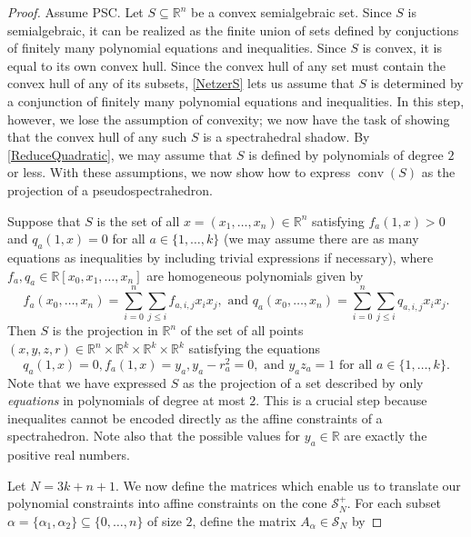 \documentclass[11pt]{article} %
\newcommand{\R}{\mathbb{R}}
\newcommand{\s}{\mathcal{S}}
\DeclareMathOperator{\conv}{conv}
\begin{document}
\begin{proof}
Assume PSC. Let $S \subseteq \R^n$ be a convex semialgebraic set. Since $S$ is semialgebraic, it can be realized as the finite union of sets defined by conjuctions of finitely many polynomial equations and inequalities. Since $S$ is convex, it is equal to its own convex hull. Since the convex hull of any set must contain the convex hull of any of its subsets, \ref{NetzerS} lets us assume that $S$ is determined by a conjunction of finitely many polynomial equations and inequalities. In this step, however, we lose the assumption of convexity; we now have the task of showing that the convex hull of any such $S$ is a spectrahedral shadow. By \ref{ReduceQuadratic}, we may assume that $S$ is defined by polynomials of degree $2$ or less. With these assumptions, we now show how to express $\conv( S)$ as the projection of a pseudospectrahedron.

Suppose that $S$ is the set of all $x=(x_1,\ldots,x_n) \in \R^n$ satisfying $f_a(1,x) > 0$ and $q_a(1,x) = 0$ for all $a \in \{ 1,\ldots,k\}$ (we may assume there are as many equations as inequalities by including trivial expressions if necessary), where $f_a,q_a \in \R[x_0,x_1,\ldots,x_n]$ are homogeneous polynomials given by
\[f_a(x_0,\ldots,x_n) =\sum_{i=0}^{n} \sum_{j\leq i} f_{a,i,j} x_ix_j, \text{ and }q_a(x_0,\ldots,x_n) =\sum_{i=0}^{n} \sum_{j\leq i} q_{a,i,j} x_ix_j. \]
Then $S$ is the projection in $\R^n$ of the set of all points $(x,y,z,r) \in \R^n\times \R^k \times \R^k \times \R^k$ satisfying the equations
\[ q_a(1,x) =0, f_a(1,x)=y_a, y_a- r_a^2=0, \text{ and } y_az_a=1 \text{ for all } a \in \{1,\ldots,k\}.\]
Note that we have expressed $S$ as the projection of a set described by only \emph{equations} in polynomials of degree at most $2$. This is a crucial step because inequalites cannot be encoded directly as the affine constraints of a spectrahedron. Note also that the possible values for $y_a\in \R$ are exactly the positive real numbers.

Let $N=3k+n+1$. We now define the matrices which enable us to translate our polynomial constraints into affine constraints on the cone $\s_N^+$. For each subset $\alpha=\{\alpha_1,\alpha_2\} \subseteq \{0,\ldots,n\}$ of size $2$, define the matrix $A_\alpha \in \s_N$ by


\end{proof}
\end{document}

